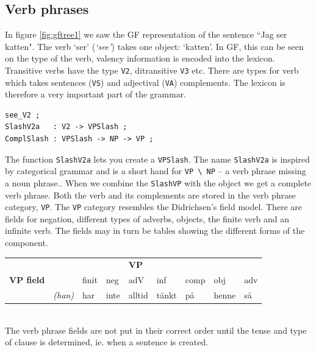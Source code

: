 \documentclass{report}
\begin{document}
\subsection{Verb phrases}
In figure \ref{fig:gftree1} we saw the GF representation of the sentence ``Jag
ser katten". The verb `ser' (\emph{`see'}) takes one object: `katten'.
In GF, this can be seen on the type of the verb,
valency information
is encoded into the lexicon. Transitive verbs have the type \verb-V2-, ditransitive
\verb-V3- etc. There are types for verb which takes sentences (\verb-VS-) and
adjectival (\verb-VA-) complements.
The lexicon is therefore a very important part of the
grammar. 
\begin{verbatim}
see_V2 ; 
SlashV2a   : V2 -> VPSlash ;
ComplSlash : VPSlash -> NP -> VP ;
\end{verbatim}

The function \verb-SlashV2a- lets you create a \verb-VPSlash-. The name
\verb-SlashV2a- is inspired by categorical grammar and is a short
hand for \verb-VP \ NP- -- a verb phrase missing a
noun phrase..  When we combine the \verb-SlashVP- with the object we
get a complete verb phrase.
Both the verb and its complements are stored in the verb phrase category, \verb-VP-.
The \verb-VP- category resembles the Didrichsen's field model.
There are fields
for negation, different types of adverbs, objects, the finite verb and an infinite verb.
The fields may in turn be tables showing the different forms of the component.\\

\begin{tabular}{|l|llllllll|}
\hline
& & &&\textbf{VP}& & & & \\
\textbf{VP field} && \sc finit& \sc neg& \sc adV & \sc inf& \sc comp& \sc obj& \sc adv \\
\hline
&\emph{(han)} & har &  inte&  alltid&  tänkt&  på&  henne&  så \\
\hline
\end{tabular}\\

\vspace{5mm}
The verb phrase fields are not put in their correct order until the tense and type
of clause is determined, ie. when a sentence is created.\\
\end{document}
